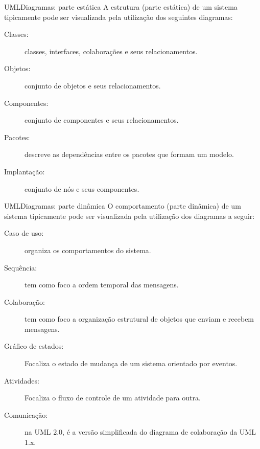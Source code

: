 \begin{frame}{UML}{Diagramas: parte estática}
  A \alert{estrutura (parte estática)} de um sistema tipicamente pode ser
  visualizada pela utilização dos seguintes diagramas:

  \begin{description}
  \item[Classes:] classes, interfaces, colaborações e seus relacionamentos.\pause
  \item[Objetos:] conjunto de objetos e seus relacionamentos.\pause
  \item[Componentes:] conjunto de componentes e seus relacionamentos.\pause
  \item[Pacotes:] descreve as dependências entre os pacotes que formam um modelo.\pause
  \item[Implantação:] conjunto de nós e seus componentes.
  \end{description}

\end{frame}

\begin{frame}{UML}{Diagramas: parte dinâmica}
  O \alert{comportamento (parte dinâmica)} de um sistema tipicamente pode ser
  visualizada pela utilização dos diagramas a seguir:

  \begin{description}
  \item[Caso de uso:] organiza os comportamentos do sistema.\pause
  \item[Sequência:] tem como foco a ordem temporal das mensagens.\pause
  \item[Colaboração:] tem como foco a organização estrutural de objetos que enviam 
    e recebem mensagens.\pause
  \item[Gráfico de estados:] Focaliza o estado de mudança de um
    sistema orientado por eventos.\pause
  \item[Atividades:] Focaliza o fluxo de controle de um atividade para outra.\pause
  \item[Comunicação:] na UML 2.0, é a versão simplificada do diagrama de 
    colaboração da UML 1.x.
  \end{description}

\end{frame}

